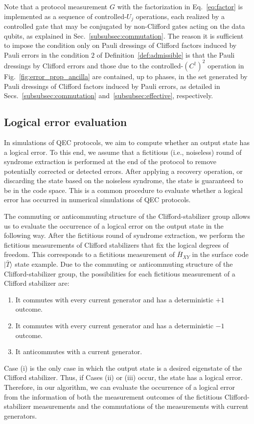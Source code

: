 \documentclass[
 reprint,
 amsmath,amssymb,
 pra,superscriptaddress, nofootinbib
]{revtex4-2}
\theoremstyle{definition}
\theoremstyle{plain}
\begin{document}
Note that a protocol measurement $G$ with the factorization in Eq.~\eqref{eq:factor} is implemented as a sequence of controlled-$U_j$ operations, each realized by a controlled gate that may be conjugated by non-Clifford gates acting on the data qubits, as explained in Sec.~\ref{subsubsec:commutation}.
The reason it is sufficient to impose the condition only on Pauli dressings of Clifford factors induced by Pauli errors in the condition $2$ of Definition~\ref{def:admissible} is that the Pauli dressings by Clifford errors and those due to the controlled-$(C^\dagger)^2$ operation in Fig.~\ref{fig:error_prop_ancilla} are contained, up to phases, in the set generated by Pauli dressings of Clifford factors induced by Pauli errors, as detailed in Secs.~\ref{subsubsec:commutation} and~\ref{subsubsec:effective}, respectively.

\subsection{Logical error evaluation}
\label{subsec:logical_error}
In simulations of QEC protocols, we aim to compute whether an output state has a logical error. To this end, we assume that a fictitious (i.e., noiseless) round of syndrome extraction is performed at the end of the protocol to remove potentially corrected or detected errors. After applying a recovery operation, or discarding the state based on the noiseless syndrome, the state is guaranteed to be in the code space. 
This is a common procedure to evaluate whether a logical error has occurred in numerical simulations of QEC protocols.

The commuting or anticommuting structure of the Clifford-stabilizer group allows us to evaluate the occurrence of a logical error on the output state in the following way.
After the fictitious round of syndrome extraction, we perform the fictitious measurements of Clifford stabilizers that fix the logical degrees of freedom. This corresponds to a fictitious measurement of $\bar{H}_{XY}$ in the surface code $|\bar{T}\rangle$ state example.
Due to the commuting or anticommuting structure of the Clifford-stabilizer group, the possibilities for each fictitious measurement of a Clifford stabilizer are: 
\begin{enumerate}[label=(\roman*)]
  \item It commutes with every current generator and has a deterministic $+1$ outcome.
  \item It commutes with every current generator and has a deterministic $-1$ outcome.
  \item It anticommutes with a current generator.
\end{enumerate}
Case ($\mathrm{i}$) is the only case in which the output state is a desired eigenstate of the Clifford stabilizer. Thus, if Cases ($\mathrm{ii}$) or ($\mathrm{iii}$) occur, the state has a logical error. 
Therefore, in our algorithm, we can evaluate the occurrence of a logical error from the information of both the measurement outcomes of the fictitious Clifford-stabilizer measurements and the commutations of the measurements with current generators.
\end{document}

